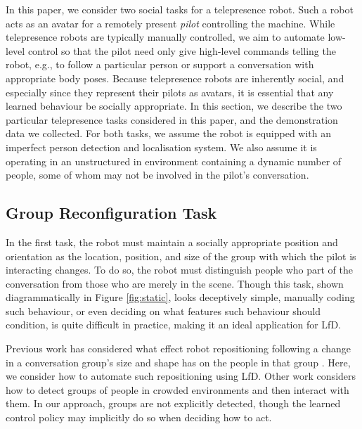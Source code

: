\documentclass[letterpaper, 10 pt, conference]{ieeeconf}
\begin{document}
In this paper, we consider two social tasks for a telepresence robot.  Such a robot acts as an avatar for a remotely present \emph{pilot} controlling the machine.  While telepresence robots are typically manually controlled, we aim to automate low-level control so that the pilot need only give high-level commands telling the robot, e.g., to follow a particular person or support a conversation with appropriate body poses.  Because telepresence robots are inherently social, and especially since they represent their pilots as avatars, it is essential that any learned behaviour be socially appropriate. In this section, we describe the two particular telepresence tasks considered in this paper, and the demonstration data we collected.  For both tasks, we assume the robot is equipped with an imperfect person detection and localisation system.  We also assume it is operating in an unstructured in environment containing a dynamic number of people, some of whom may not be involved in the pilot's conversation.

\subsection{Group Reconfiguration Task} 

In the first task, the robot must maintain a socially appropriate position and orientation as the location, position, and size of the group with which the pilot is interacting changes.  To do so, the robot must distinguish people who part of the conversation from those who are merely in the scene. Though this task, shown diagrammatically in Figure \ref{fig:static}, looks deceptively simple, manually coding such behaviour, or even deciding on what features such behaviour should condition, is quite difficult in practice, making it an ideal application for LfD.

Previous work has considered what effect robot repositioning following a change in a conversation group's size and shape has on the people in that group \cite{kuzuoka2010reconfiguring,vroon2015dynamics}. Here, we consider how to automate such repositioning using LfD.  Other work considers how to detect groups of people in crowded environments \cite{lau2010multi} and then interact with them.  In our approach, groups are not explicitly detected, though the learned control policy may implicitly do so when deciding how to act.
\end{document}
